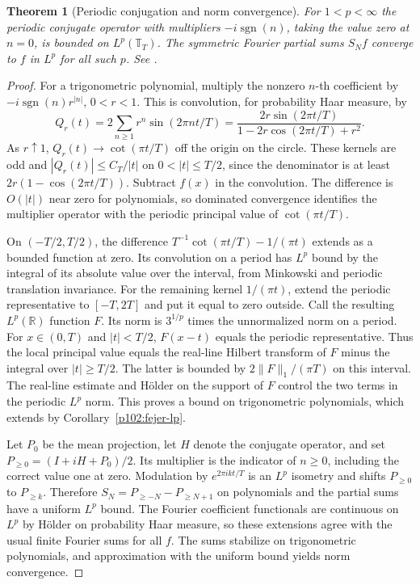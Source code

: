 \documentclass[11pt,oneside,openany]{book}
\newtheorem{theorem}{Theorem}[chapter]
\theoremstyle{definition}
\theoremstyle{remark}
\begin{document}
\begin{theorem}[Periodic conjugation and norm convergence]
\label{p102:U3-04}
For \(1<p<\infty\) the periodic conjugate operator with multipliers
\(-i\operatorname{sgn}(n)\), taking the value zero at \(n=0\), is bounded on \(L^p(\mathbb T_T)\). The symmetric Fourier partial sums \(S_N f\) converge to \(f\) in \(L^p\) for all such \(p\). See \cite[\S4.1]{grafakos}.
\end{theorem}
\begin{proof}
For a trigonometric polynomial, multiply the nonzero \(n\)-th coefficient by \(-i\operatorname{sgn}(n)r^{|n|}\), \(0<r<1\). This is convolution, for probability Haar measure, by
\[
 Q_r(t)=2\sum_{n\ge1}r^n\sin(2\pi nt/T)
       =\frac{2r\sin(2\pi t/T)}{1-2r\cos(2\pi t/T)+r^2}.
\]
As \(r\uparrow1\), \(Q_r(t)\to\cot(\pi t/T)\) off the origin on the circle. These kernels are odd and \(|Q_r(t)|\le C_T/|t|\) on \(0<|t|\le T/2\), since the denominator is at least \(2r(1-\cos(2\pi t/T))\). Subtract \(f(x)\) in the convolution. The difference is \(O(|t|)\) near zero for polynomials, so dominated convergence identifies the multiplier operator with the periodic principal value of \(\cot(\pi t/T)\).

On \((-T/2,T/2)\), the difference \(T^{-1}\cot(\pi t/T)-1/(\pi t)\) extends as a bounded function at zero. Its convolution on a period has \(L^p\) bound by the integral of its absolute value over the interval, from Minkowski and periodic translation invariance. For the remaining kernel \(1/(\pi t)\), extend the periodic representative to \([-T,2T]\) and put it equal to zero outside. Call the resulting \(L^p(\mathbb R)\) function \(F\). Its norm is \(3^{1/p}\) times the unnormalized norm on a period. For \(x\in(0,T)\) and \(|t|<T/2\), \(F(x-t)\) equals the periodic representative. Thus the local principal value equals the real-line Hilbert transform of \(F\) minus the integral over \(|t|\ge T/2\). The latter is bounded by \(2\|F\|_1/(\pi T)\) on this interval. The real-line estimate and Hölder on the support of \(F\) control the two terms in the periodic \(L^p\) norm. This proves a bound on trigonometric polynomials, which extends by Corollary~\ref{p102:fejer-lp}.

Let \(P_0\) be the mean projection, let \(H\) denote the conjugate operator, and set \(P_{\ge0}=(I+iH+P_0)/2\). Its multiplier is the indicator of \(n\ge0\), including the correct value one at zero. Modulation by \(e^{2\pi i kt/T}\) is an \(L^p\) isometry and shifts \(P_{\ge0}\) to \(P_{\ge k}\). Therefore \(S_N=P_{\ge-N}-P_{\ge N+1}\) on polynomials and the partial sums have a uniform \(L^p\) bound. The Fourier coefficient functionals are continuous on \(L^p\) by Hölder on probability Haar measure, so these extensions agree with the usual finite Fourier sums for all \(f\). The sums stabilize on trigonometric polynomials, and approximation with the uniform bound yields norm convergence.
\end{proof}
\end{document}

